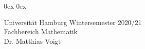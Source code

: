 \usepackage{amsmath,amssymb,amsthm,amsfonts}
\usepackage[utf8]{inputenc}
\usepackage{algorithmic,algorithm}
\usepackage{graphics,graphicx}
\usepackage{pgfplots,tikz}
\usepackage{enumerate}
\usepackage[ngerman]{babel}
\usepackage{hyperref}
\usepackage{caption, subcaption}

\renewcommand{\algorithmicrequire}{\textbf{Input:}}
\renewcommand{\algorithmicensure}{\textbf{Output:}}

\topmargin-15mm
\oddsidemargin-5mm    %
\textwidth17cm    %
\thispagestyle{empty}
\parindent0mm
\parskip0ex
\parskip0ex

\makeatletter
\DeclareOldFontCommand{\rm}{\normalfont\rmfamily}{\mathrm}
\DeclareOldFontCommand{\sf}{\normalfont\sffamily}{\mathsf}
\DeclareOldFontCommand{\tt}{\normalfont\ttfamily}{\mathtt}
\DeclareOldFontCommand{\bf}{\normalfont\bfseries}{\mathbf}
\DeclareOldFontCommand{\it}{\normalfont\itshape}{\mathit}
\DeclareOldFontCommand{\sl}{\normalfont\slshape}{\@nomath\sl}
\DeclareOldFontCommand{\sc}{\normalfont\scshape}{\@nomath\sc}
\makeatother


\newcommand{\Aufgabe}[2][]{\par\bigskip{\sf\bfseries Aufgabe #2#1:}}
\usepackage{mymacros}


{\sf Universit\"at Hamburg \hfill Wintersemester 2020/21 \\ Fachbereich Mathematik \\ Dr. Matthias Voigt}
\begin{center}
\end{center}

\renewcommand{\tilde}{\widetilde}
\renewcommand{\hat}{\widehat}
\newcommand{\ri}{\mathrm{i}}
\renewcommand{\H}{\mathsf{H}}
\newcommand{\T}{\mathsf{T}}
